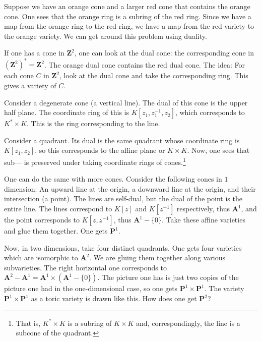 \documentclass [11 pt, oneside] {article}
\begin{document}
\begin{example}
Suppose we have an orange cone and a larger red cone that contains the orange cone. One sees that the orange ring is a subring of the red ring. Since we have a map from the orange ring to the red ring, we have a map from the red variety to the orange variety. We can get around this problem using duality. 

If one has a cone in $\mathbf{Z}^2$, one can look at the dual cone: the corresponding cone in $(\mathbf{Z}^2)^*=\mathbf{Z}^2$. The orange dual cone contains the red dual cone. The idea: For each cone $C$ in $\mathbf{Z}^2$, look at the dual cone and take the corresponding ring. This gives a variety of $C$.

Consider a degenerate cone (a vertical line). The dual of this cone is the upper half plane. The coordinate ring of this is $K[z_1,z_1^{-1},z_2]$, which corresponds to $K^*\times K$. This is the ring corresponding to the line.

Consider a quadrant. Its dual is the same quadrant whose coordinate ring is $K[z_1,z_2]$, so this corresponds to the affine plane or $K\times K$. Now, one sees that sub--- is preserved under taking coordinate rings of cones.\footnote{That is, $K^*\times K$ is a subring of $K\times K$ and, correspondingly, the line is a subcone of the quadrant.}
\end{example}

		One can do the same with more cones. Consider the following cones in $1$ dimension: An upward line at the origin, a downward line at the origin, and their intersection (a point). The lines are self-dual, but the dual of the point is the entire line. The lines correspond to $K[z]$ and $K[z^{-1}]$ respectively, thus $\mathbf{A}^1$, and the point corresponds to $K[z,z^{-1}]$, thus $\mathbf{A}^1 - \{0\}$. Take these affine varieties and glue them together. One gets $\mathbf{P}^1$. 


Now, in two dimensions, take four distinct quadrants. One gets four varieties which are isomorphic to $\mathbf{A}^2$. We are gluing them together along various subvarieties. The right horizontal one corresponds to $\mathbf{A}^2 - \mathbf{A}^1 = \mathbf{A}^1 \times (\mathbf{A}^1 - \{0\})$. The picture one has is just two copies of the picture one had in the one-dimensional case, so one gets $\mathbf{P}^1\times \mathbf{P}^1$. The variety $\mathbf{P}^1 \times \mathbf{P}^1$ as a toric variety is drawn like this. How does one get $\mathbf{P}^2$?
\end{document}

